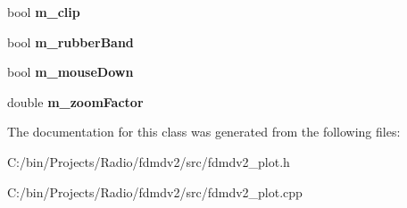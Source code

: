 \begin{DoxyCompactItemize}
\item 
\hypertarget{class_plot_panel_a07334de87de07eeab43eabbdaf730ab5}{bool {\bfseries m\-\_\-clip}}\label{class_plot_panel_a07334de87de07eeab43eabbdaf730ab5}

\item 
\hypertarget{class_plot_panel_a7182715e509f98f42e78210d324fe042}{bool {\bfseries m\-\_\-rubber\-Band}}\label{class_plot_panel_a7182715e509f98f42e78210d324fe042}

\item 
\hypertarget{class_plot_panel_acebe9485868374626f03516e3508b592}{bool {\bfseries m\-\_\-mouse\-Down}}\label{class_plot_panel_acebe9485868374626f03516e3508b592}

\item 
\hypertarget{class_plot_panel_ae2f4907a8e4ed958ef4995e99b1f7148}{double {\bfseries m\-\_\-zoom\-Factor}}\label{class_plot_panel_ae2f4907a8e4ed958ef4995e99b1f7148}

\end{DoxyCompactItemize}


The documentation for this class was generated from the following files\-:\begin{DoxyCompactItemize}
\item 
C\-:/bin/\-Projects/\-Radio/fdmdv2/src/fdmdv2\-\_\-plot.\-h\item 
C\-:/bin/\-Projects/\-Radio/fdmdv2/src/fdmdv2\-\_\-plot.\-cpp\end{DoxyCompactItemize}
